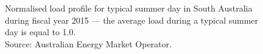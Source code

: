 \documentclass[conference]{IEEEtran}
\begin{document}
\begin{figure}[!t]
	\centering
	\caption[Normalised load profile for typical summer day]{Normalised load profile for typical summer day in South Australia during fiscal year 2015 --- the average load during a typical summer day is equal to 1.0.	\protect\\
		{\footnotesize Source: Australian Energy Market Operator.}} 
	\label{fig:load_prof_norm_summer}
	\scalebox{0.61}{
		
	}
\end{figure}


\end{document}

